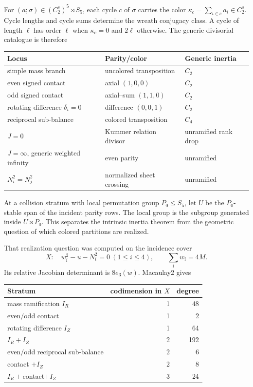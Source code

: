 \documentclass[11pt]{article}
\theoremstyle{definition}
\theoremstyle{remark}
\begin{document}
For $(a;\sigma)\in(C_2^s)^5\rtimes S_5$, each cycle $c$ of $\sigma$ carries
the color $\kappa_c=\sum_{i\in c}a_i\in C_2^s$. Cycle lengths and cycle sums
determine the wreath conjugacy class. A cycle of length $\ell$ has order
$\ell$ when $\kappa_c=0$ and $2\ell$ otherwise. The generic divisorial
catalogue is therefore
\begin{center}
\begin{tabular}{@{}lll@{}}
\toprule
Locus & Parity/color & Generic inertia\\
\midrule
simple mass branch & uncolored transposition & $C_2$\\
even signed contact & axial $(1,0,0)$ & $C_2$\\
odd signed contact & axial--sum $(1,1,0)$ & $C_2$\\
rotating difference $\delta_i=0$ & difference $(0,0,1)$ & $C_2$\\
reciprocal sub-balance & colored transposition & $C_4$\\
$J=0$ & Kummer relation divisor & unramified rank drop\\
$J=\infty$, generic weighted infinity & even parity & unramified\\
$N_i^2=N_j^2$ & normalized sheet crossing & unramified\\
\bottomrule
\end{tabular}
\end{center}
At a collision stratum with local permutation group $P_0\le S_5$, let $U$
be the $P_0$-stable span of the incident parity rows. The local group is the
subgroup generated inside $U\rtimes P_0$. This separates the intrinsic inertia
theorem from the geometric question of which colored partitions are realized.

That realization question was computed on the incidence cover
\begin{equation}
X:\quad w_i^2-u-N_i^2=0\ (1\le i\le4),\qquad \sum_iw_i=4M.
\label{eq:incidence}
\end{equation}
Its relative Jacobian determinant is $8e_3(w)$. Macaulay2 gives
\begin{center}
\begin{tabular}{@{}lrr@{}}
\toprule
Stratum & codimension in $X$ & degree\\
\midrule
mass ramification $I_R$ & 1 & 48\\
even/odd contact & 1 & 2\\
rotating difference $I_Z$ & 1 & 64\\
$I_R+I_Z$ & 2 & 192\\
even/odd reciprocal sub-balance & 2 & 6\\
contact $+I_Z$ & 2 & 8\\
$I_R+$contact$+I_Z$ & 3 & 24\\
\bottomrule
\end{tabular}
\end{center}
\end{document}
